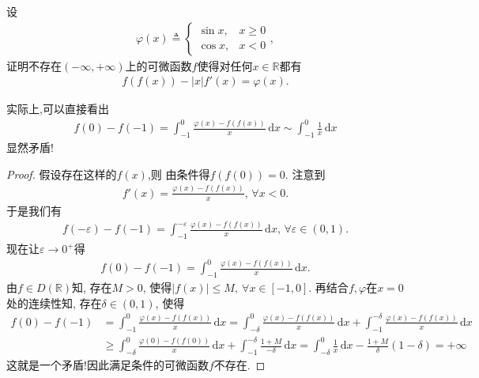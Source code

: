 \documentclass[../../main.tex]{subfiles}
\begin{document}
\begin{example}
设
\begin{align*}
\varphi(x) \triangleq \begin{cases} 
\sin x, & x \geqslant 0 \\
\cos x, & x < 0 
\end{cases},
\end{align*}
证明不存在$(-\infty,+\infty)$上的可微函数$f$使得对任何$x \in \mathbb{R}$都有
\begin{align*}
f(f(x)) - |x| f'(x) = \varphi(x).
\end{align*}
\end{example}
\begin{note}
实际上,可以直接看出
\begin{align*}
f(0) - f(-1) = \int_{-1}^0 \frac{\varphi(x) - f(f(x))}{x} \, \mathrm{d}x \sim \int_{-1}^0 \frac{1}{x} \, \mathrm{d}x
\end{align*}
显然矛盾!
\end{note}
\begin{proof}
假设存在这样的$f(x)$,则
由条件得$f(f(0))=0$. 注意到
\begin{align*}
f'(x) = \frac{\varphi(x) - f(f(x))}{x}, \, \forall x < 0.
\end{align*}
于是我们有
\begin{align*}
f(-\varepsilon) - f(-1) = \int_{-1}^{-\varepsilon} \frac{\varphi(x) - f(f(x))}{x} \, \mathrm{d}x, \, \forall \varepsilon \in (0,1).
\end{align*}
现在让$\varepsilon \to 0^+$得
\begin{align*}
f(0) - f(-1) = \int_{-1}^0 \frac{\varphi(x) - f(f(x))}{x} \, \mathrm{d}x.
\end{align*}
由$f \in D(\mathbb{R})$知, 存在$M > 0$, 使得$|f(x)| \leqslant M,\ \forall x \in [-1,0]$. 再结合$f,\varphi$在$x=0$处的连续性知, 存在$\delta \in (0,1)$, 使得
\begin{align*}
f(0)-f(-1) &= \int_{-1}^0 \frac{\varphi(x) - f(f(x))}{x} \, \mathrm{d}x = \int_{-\delta}^0 \frac{\varphi(x) - f(f(x))}{x} \, \mathrm{d}x + \int_{-1}^{-\delta} \frac{\varphi(x) - f(f(x))}{x} \, \mathrm{d}x \\
&\geqslant \int_{-\delta}^0 \frac{\varphi(0) - f(f(0))}{x} \, \mathrm{d}x + \int_{-1}^{-\delta} \frac{1 + M}{-\delta} \, \mathrm{d}x = \int_{-\delta}^0 \frac{1}{x} \, \mathrm{d}x - \frac{1 + M}{\delta}(1 - \delta) = +\infty
\end{align*}
这就是一个矛盾!因此满足条件的可微函数$f$不存在.

\end{proof}
\end{document}
